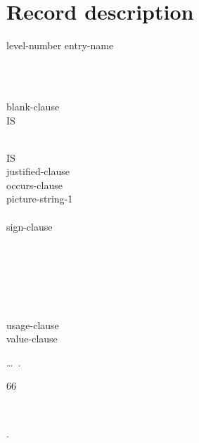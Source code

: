 \section{Record description}
level-number entry-name
\begin{0-1}
  \begin{1=}
     \\
  \end{1=} \\

  blank-clause \\

  IS 
  \begin{0-1}
     \literal
  \end{0-1} \\

  IS  \\

  justified-clause \\

  occurs-clause \\

   picture-string-1 \\

   \identifier \\

  sign-clause \\

  \begin{1=}
     \\
     \\
  \end{1=}
  \begin{0-1}
     \\
  \end{0-1} \\

  usage-clause \\

  value-clause
\end{0-1}\ldots\ {}.

66 \identifier {} \identifier
\begin{0-1}
  \begin{1=}
     \\
  \end{1=}
  \identifier
\end{0-1}.

